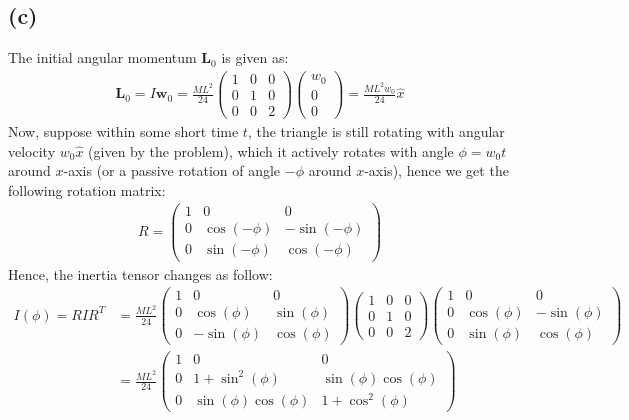 \documentclass{article}
\newcommand{\bL}{\textbf{L}} %
\newcommand{\bw}{\textbf{w}} %
\begin{document}
\subsection*{(c)}
The initial angular momentum $\bL_0$ is given as:
\begin{align}
    \bL_0=I\bw_0 = \frac{ML^2}{24}\begin{pmatrix}
        1&0&0\\0&1&0\\0&0&2
    \end{pmatrix}\begin{pmatrix}
        w_0\\0\\0
    \end{pmatrix} = \frac{ML^2w_0}{24}\hat{x}
\end{align}
Now, suppose within some short time $t$, the triangle is still rotating with angular velocity $w_0\hat{x}$ (given by the problem), which it actively rotates with angle $\phi=w_0t$ around $x$-axis (or a passive rotation of angle $-\phi$ around $x$-axis), hence we get the following rotation matrix:
\begin{align}
    R=\begin{pmatrix}
        1&0&0\\
        0&\cos(-\phi) &-\sin(-\phi)\\
        0&\sin(-\phi)&\cos(-\phi)
    \end{pmatrix}
\end{align}
Hence, the inertia tensor changes as follow:
\begin{align}
    I(\phi) = RIR^T &= \frac{ML^2}{24}\begin{pmatrix}
        1&0&0\\
        0&\cos(\phi) &\sin(\phi)\\
        0&-\sin(\phi)&\cos(\phi)
    \end{pmatrix}\begin{pmatrix}
        1&0&0\\0&1&0\\0&0&2
    \end{pmatrix}\begin{pmatrix}
        1&0&0\\
        0&\cos(\phi) &-\sin(\phi)\\
        0&\sin(\phi)&\cos(\phi)
    \end{pmatrix}\\
    &=\frac{ML^2}{24}\begin{pmatrix}
        1&0&0\\
        0&1+\sin^2(\phi)&\sin(\phi)\cos(\phi)\\
        0&\sin(\phi)\cos(\phi) & 1+\cos^2(\phi)
    \end{pmatrix}
\end{align}
\end{document}
